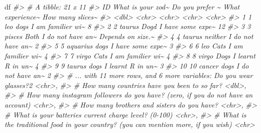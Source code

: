 \documentclass[
]{article}
\newenvironment{Shaded}{\begin{snugshade}}{\end{snugshade}}
\newcommand{\CommentTok}[1]{\textcolor[rgb]{0.56,0.35,0.01}{\textit{#1}}}
\newcommand{\NormalTok}[1]{#1}
\begin{document}
\begin{Shaded}
\begin{Highlighting}[]
\NormalTok{df}
\CommentTok{\#\textgreater{} \# A tibble: 21 x 11}
\CommentTok{\#\textgreater{}       ID \textasciigrave{}What is your zod\textasciitilde{} \textasciigrave{}Do you prefer \textasciitilde{} \textasciigrave{}What experience\textasciitilde{} \textasciigrave{}How many slices\textasciitilde{}}
\CommentTok{\#\textgreater{}    \textless{}dbl\textgreater{} \textless{}chr\textgreater{}              \textless{}chr\textgreater{}            \textless{}chr\textgreater{}             \textless{}chr\textgreater{}            }
\CommentTok{\#\textgreater{}  1     1 leo                dogs             I am familier wi\textasciitilde{} 8                }
\CommentTok{\#\textgreater{}  2     2 taurus             Dogd             I have some expe\textasciitilde{} 12               }
\CommentTok{\#\textgreater{}  3     3 pisces             Both             I do not have an\textasciitilde{} Depends on size.\textasciitilde{}}
\CommentTok{\#\textgreater{}  4     4 taurus             neither          I do not have an\textasciitilde{} 2                }
\CommentTok{\#\textgreater{}  5     5 aquarius           dogs             I have some expe\textasciitilde{} 3                }
\CommentTok{\#\textgreater{}  6     6 leo                Cats             I am familier wi\textasciitilde{} 4                }
\CommentTok{\#\textgreater{}  7     7 virgo              Cats             I am familier wi\textasciitilde{} 4                }
\CommentTok{\#\textgreater{}  8     8 virgo              Dogs             I learnt R in un\textasciitilde{} 4                }
\CommentTok{\#\textgreater{}  9     9 taurus             dogs             I learnt R in un\textasciitilde{} 3                }
\CommentTok{\#\textgreater{} 10    10 cancer             dogs             I do not have an\textasciitilde{} 2                }
\CommentTok{\#\textgreater{} \# ... with 11 more rows, and 6 more variables: Do you wear glasses?2 \textless{}chr\textgreater{},}
\CommentTok{\#\textgreater{} \#   How many countries have you been to so far? \textless{}dbl\textgreater{},}
\CommentTok{\#\textgreater{} \#   How many instagram followers do you have? (zero, if you do not have an account) \textless{}chr\textgreater{},}
\CommentTok{\#\textgreater{} \#   How many brothers and sisters do you have? \textless{}chr\textgreater{},}
\CommentTok{\#\textgreater{} \#   What is your batteries current charge level? (0{-}100) \textless{}chr\textgreater{},}
\CommentTok{\#\textgreater{} \#   What is the traditional food in your country? (you can mention more, if you wish) \textless{}chr\textgreater{}}
\end{Highlighting}
\end{Shaded}
\end{document}
